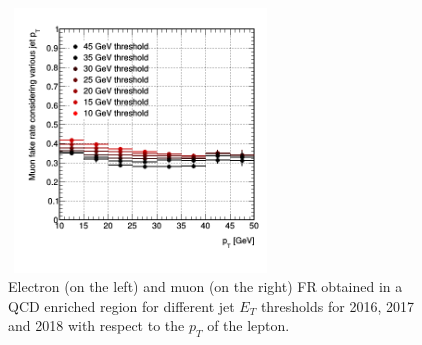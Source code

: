 \documentclass[a4paper, 10pt, openright]{report}
\begin{document}
\begin{figure}[htbp]
{\begin{minipage}[b]{.48\textwidth}
\end{minipage}\hfill
\begin{minipage}[b]{.48\textwidth}
\includegraphics[width=7cm, height=7cm]{figs/Muon_FR_pt_combined_2017.png}
\end{minipage} \hfill
}
\caption{Electron (on the left) and muon (on the right) \ac{FR} obtained in a QCD enriched region for different jet $E_T$ thresholds for 2016, 2017 and 2018 with respect to the $p_T$ of the lepton.}
\label{fig:FR}
\end{figure}
\end{document}
